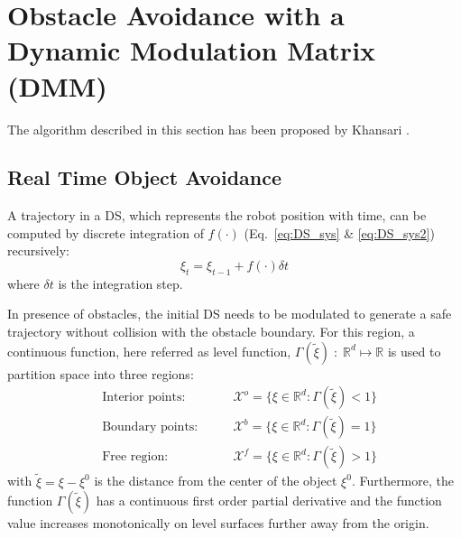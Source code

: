 \section{Obstacle Avoidance with a Dynamic Modulation Matrix (DMM) } \label{sec:DMM}
The algorithm described in this section has been proposed by Khansari \cite{khansari2012dynamical}.

\subsection{Real Time Object Avoidance}
A trajectory in a DS, which represents the robot position with time, can be computed by discrete integration of $f(\cdot)$ (Eq.~\ref{eq:DS_sys} \& \ref{eq:DS_sys2}) recursively:
\begin{equation}
  \xi_{t} = \xi_{t-1} + f(\cdot) \delta t
\end{equation}
where $\delta t$ is the integration step.

In presence of obstacles, the initial DS needs to be modulated to generate a safe trajectory without collision with the obstacle boundary. For this region, a continuous function, here referred as level function, $\Gamma(\tilde \xi) \; : \;\mathbb{R}^d \mapsto \mathbb{R}$ is used to partition space into three regions:
\begin{align}
  &\text{Interior points:}  \qquad & \mathcal{X}^o = \{\xi \in \mathbb{R}^d: \Gamma(\tilde \xi) < 1 \} \\
  &\text{Boundary points:}  \qquad & \mathcal{X}^b = \{\xi \in \mathbb{R}^d: \Gamma(\tilde \xi) = 1 \} \\
  &\text{Free region:}  \qquad & \mathcal{X}^f = \{\xi \in \mathbb{R}^d: \Gamma(\tilde \xi) > 1 \}
\end{align}
with $\tilde \xi = \xi - \xi^0$ is the distance from the center of the object $\xi^0$. Furthermore, the function $\Gamma (\tilde \xi)$ has a continuous first order partial derivative and the function value increases monotonically on level surfaces further away from the origin.


